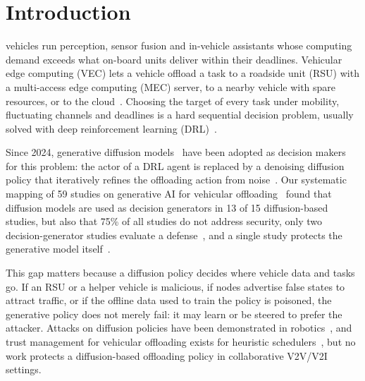 \documentclass[journal]{IEEEtran}
\begin{document}
\section{Introduction}
 vehicles run perception, sensor fusion and in-vehicle assistants whose computing demand exceeds what on-board units deliver within their deadlines. Vehicular edge computing (VEC) lets a vehicle offload a task to a roadside unit (RSU) with a multi-access edge computing (MEC) server, to a nearby vehicle with spare resources, or to the cloud~\cite{mao2017mec_survey,liu2019vec_survey}. Choosing the target of every task under mobility, fluctuating channels and deadlines is a hard sequential decision problem, usually solved with deep reinforcement learning (DRL)~\cite{uddin2025intelligent}.

Since 2024, generative diffusion models~\cite{ho2020ddpm} have been adopted as decision makers for this problem: the actor of a DRL agent is replaced by a denoising diffusion policy that iteratively refines the offloading action from noise~\cite{S154,S070,S095,S126}. Our systematic mapping of 59 studies on generative AI for vehicular offloading~\cite{ammou2027mapping} found that diffusion models are used as decision generators in 13 of 15 diffusion-based studies, but also that 75\% of all studies do not address security, only two decision-generator studies evaluate a defense~\cite{S128,S150}, and a single study protects the generative model itself~\cite{S092}.

This gap matters because a diffusion policy decides where vehicle data and tasks go. If an RSU or a helper vehicle is malicious, if nodes advertise false states to attract traffic, or if the offline data used to train the policy is poisoned, the generative policy does not merely fail: it may learn or be steered to prefer the attacker. Attacks on diffusion policies have been demonstrated in robotics~\cite{chen2024dpa}, and trust management for vehicular offloading exists for heuristic schedulers~\cite{huang2026tovec}, but no work protects a diffusion-based offloading policy in collaborative V2V/V2I settings.
\end{document}
